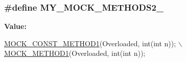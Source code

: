 \subsubsection[{\texorpdfstring{M\+Y\+\_\+\+M\+O\+C\+K\+\_\+\+M\+E\+T\+H\+O\+D\+S2\+\_\+}{MY_MOCK_METHODS2_}}]{\setlength{\rightskip}{0pt plus 5cm}\#define M\+Y\+\_\+\+M\+O\+C\+K\+\_\+\+M\+E\+T\+H\+O\+D\+S2\+\_\+}\hypertarget{gmock-generated-function-mockers__test_8cc_ac36252ad7584222cebc036d56465d652}{}\label{gmock-generated-function-mockers__test_8cc_ac36252ad7584222cebc036d56465d652}
{\bfseries Value\+:}
\begin{DoxyCode}
\hyperlink{gmock-generated-function-mockers_8h_a6f76aeb56f492cfe538e177b6aa77965}{MOCK\_CONST\_METHOD1}(Overloaded, \textcolor{keywordtype}{int}(\textcolor{keywordtype}{int} n)); \hyperlink{gmock-generated-function-mockers_8h_ac49d366be035ee87b73264a29059cdc7}{\(\backslash\)}
\hyperlink{gmock-generated-function-mockers_8h_ac49d366be035ee87b73264a29059cdc7}{    MOCK\_METHOD1}(Overloaded, \textcolor{keywordtype}{int}(\textcolor{keywordtype}{int} n));
\end{DoxyCode}
